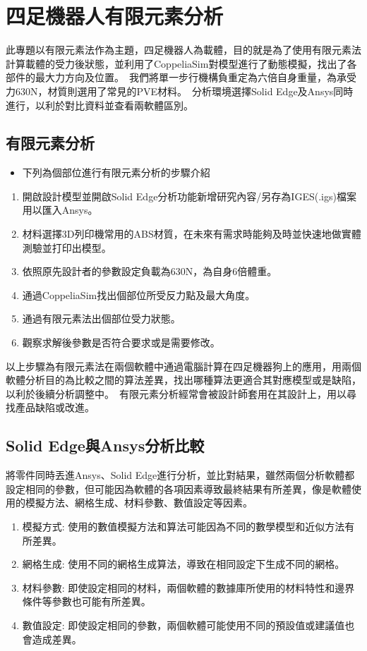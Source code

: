 \chapter{四足機器人有限元素分析}

此專題以有限元素法作為主題，四足機器人為載體，目的就是為了使用有限元素法計算載體的受力後狀態，並利用了CoppeliaSim對模型進行了動態模擬，找出了各部件的最大力方向及位置。\
我們將單一步行機構負重定為六倍自身重量，為承受力630N，材質則選用了常見的PVE材料。\
分析環境選擇Solid Edge及Ansys同時進行，以利於對比資料並查看兩軟體區別。\\

\section{有限元素分析}
\begin{itemize}
\item 下列為個部位進行有限元素分析的步驟介紹
\end{itemize}
\begin{enumerate}
\item 開啟設計模型並開啟Solid Edge分析功能新增研究內容/另存為IGES(.igs)檔案用以匯入Ansys。
\item 材料選擇3D列印機常用的ABS材質，在未來有需求時能夠及時並快速地做實體測驗並打印出模型。
\item 依照原先設計者的參數設定負載為630N，為自身6倍體重。
\item 通過CoppeliaSim找出個部位所受反力點及最大角度。
\item 通過有限元素法出個部位受力狀態。
\item 觀察求解後參數是否符合要求或是需要修改。
\end{enumerate}
以上步驟為有限元素法在兩個軟體中通過電腦計算在四足機器狗上的應用，用兩個軟體分析目的為比較之間的算法差異，找出哪種算法更適合其對應模型或是缺陷，以利於後續分析調整中。\
有限元素分析經常會被設計師套用在其設計上，用以尋找產品缺陷或改進。\
\newpage
\section{Solid Edge與Ansys分析比較}
將零件同時丟進Ansys、Solid Edge進行分析，並比對結果，雖然兩個分析軟體都設定相同的參數，但可能因為軟體的各項因素導致最終結果有所差異，像是軟體使用的模擬方法、網格生成、材料參數、數值設定等因素。\
\begin{enumerate}
\item 模擬方式: 使用的數值模擬方法和算法可能因為不同的數學模型和近似方法有所差異。
\item 網格生成: 使用不同的網格生成算法，導致在相同設定下生成不同的網格。
\item 材料參數: 即使設定相同的材料，兩個軟體的數據庫所使用的材料特性和邊界條件等參數也可能有所差異。
\item	數值設定: 即使設定相同的參數，兩個軟體可能使用不同的預設值或建議值也會造成差異。
\end{enumerate}
\newpage
